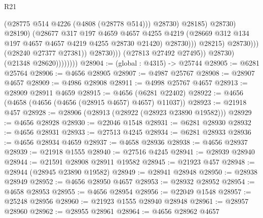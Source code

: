 \begin{lexlean}{R21}
\begin{coremodule}
                                                  (@28775 @514 @4226 (@4808 (@28778 @514)))
                                                  @28730)
                                                @28185)
                                              @28730)
                                            @28190)
                                          (@28677
                                            @317
                                            @197
                                            @4659
                                            @4657
                                            @4255
                                            @4219
                                            (@28669
                                              @312
                                              @134
                                              @197
                                              @4657
                                              @4657
                                              @4219
                                              @4255
                                              @28730
                                              @21420)
                                            @28730)))
                                      @28215)
                                    @28730)))
                              (@28240 @27377 @27381))
                            @28730)))
                      (@27813 @27492 @27495))
                    @28730)
                  (@21348 @28620))))))))
@28904 := (global : @4315) -> @25744
@28905 := @6281 @25764
@28906 := @4656 @28905
@28907 := @4987 @25767
@28908 := @28907 @4657
@28909 := @4986 @28908
@28911 := @4998 @25767 @4657
@28913 := @28909 @28911 @4659
@28915 := @4656 (@6281 @22402)
@28922 := @4656 (@4658 (@4656 (@4656 (@28915 @4657) @4657) @11037))
@28923 := @21918 @457
@28928 := @28906 (@28913 (@28922 (@28923 @23890 @19582)))
@28929 := @4656 @28928
@28930 := @22046 @1548
@28931 := @6281 @28930
@28932 := @4656 @28931
@28933 := @27513 @4245
@28934 := @6281 @28933
@28936 := @4656 @28934 @4659
@28937 := @4658 @28936
@28938 := @4656 @28937
@28939 := @21918 @1555
@28940 := @27516 @4245
@28941 := @28939 @28940
@28944 := @21591 @28908 @28911 @19582
@28945 := @21923 @457
@28948 := @28944 (@28945 @23890 @19582)
@28949 := @28941 @28948
@28950 := @28938 @28949
@28952 := @4656 @28950 @4657
@28953 := @28932 @28952
@28954 := @4658 @28953
@28955 := @4656 @28954
@28956 := @22049 @1548
@28957 := @25248 @28956
@28960 := @21923 @1555 @28940 @28948
@28961 := @28957 @28960
@28962 := @28955 @28961
@28964 := @4656 @28962 @4657

\end{coremodule}
\end{lexlean}

